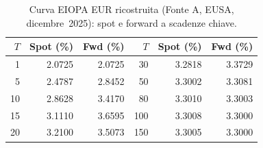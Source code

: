 \begin{table}[H]\centering\small
\caption{Curva EIOPA EUR ricostruita (Fonte A, EUSA, dicembre~2025): spot e forward a scadenze chiave.}
\label{tab:curva}\renewcommand{\arraystretch}{1.2}
\begin{tabular}{rrr|rrr}
\toprule
$T$ & Spot (\%) & Fwd (\%) & $T$ & Spot (\%) & Fwd (\%)\\
\midrule
1 & 2.0725 & 2.0725 & 30 & 3.2818 & 3.3729\\
5 & 2.4787 & 2.8452 & 50 & 3.3002 & 3.3081\\
10 & 2.8628 & 3.4170 & 80 & 3.3010 & 3.3003\\
15 & 3.1110 & 3.6595 & 100 & 3.3008 & 3.3000\\
20 & 3.2100 & 3.5073 & 150 & 3.3005 & 3.3000\\
\bottomrule
\end{tabular}
\end{table}
